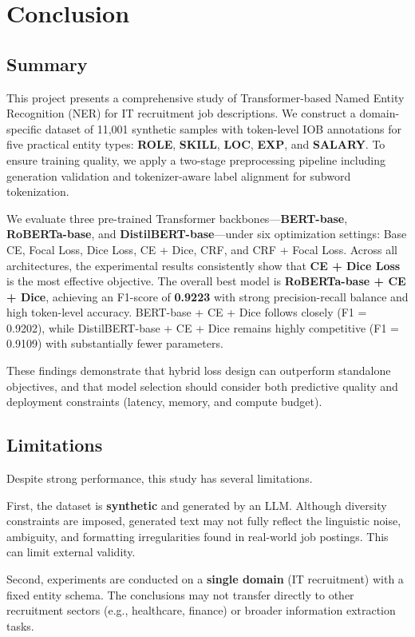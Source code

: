 \section{Conclusion}

\subsection{Summary}
This project presents a comprehensive study of Transformer-based Named Entity Recognition (NER) for IT recruitment job descriptions. We construct a domain-specific dataset of 11{,}001 synthetic samples with token-level IOB annotations for five practical entity types: \textbf{ROLE}, \textbf{SKILL}, \textbf{LOC}, \textbf{EXP}, and \textbf{SALARY}. To ensure training quality, we apply a two-stage preprocessing pipeline including generation validation and tokenizer-aware label alignment for subword tokenization.

We evaluate three pre-trained Transformer backbones---\textbf{BERT-base}, \textbf{RoBERTa-base}, and \textbf{DistilBERT-base}---under six optimization settings: Base CE, Focal Loss, Dice Loss, CE + Dice, CRF, and CRF + Focal Loss. Across all architectures, the experimental results consistently show that \textbf{CE + Dice Loss} is the most effective objective. The overall best model is \textbf{RoBERTa-base + CE + Dice}, achieving an F1-score of \textbf{0.9223} with strong precision-recall balance and high token-level accuracy. BERT-base + CE + Dice follows closely (F1 = 0.9202), while DistilBERT-base + CE + Dice remains highly competitive (F1 = 0.9109) with substantially fewer parameters.

These findings demonstrate that hybrid loss design can outperform standalone objectives, and that model selection should consider both predictive quality and deployment constraints (latency, memory, and compute budget).

\subsection{Limitations}
Despite strong performance, this study has several limitations.

First, the dataset is \textbf{synthetic} and generated by an LLM. Although diversity constraints are imposed, generated text may not fully reflect the linguistic noise, ambiguity, and formatting irregularities found in real-world job postings. This can limit external validity.

Second, experiments are conducted on a \textbf{single domain} (IT recruitment) with a fixed entity schema. The conclusions may not transfer directly to other recruitment sectors (e.g., healthcare, finance) or broader information extraction tasks.

